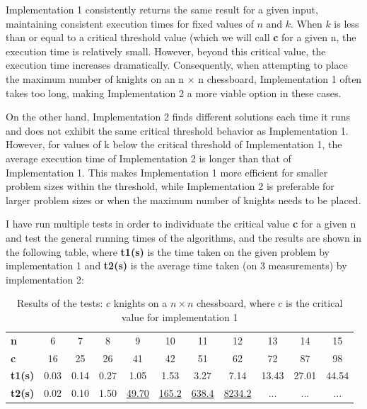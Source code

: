 \documentclass[a4paper,12pt]{article}
\begin{document}
Implementation 1 consistently returns the same result for a given input, maintaining consistent execution times for fixed values of \(n\) and \(k\). When \(k\) is less than or equal to a critical threshold value (which we will call \textbf{c} for a given n, the execution time is relatively small. However, beyond this critical value, the execution time increases dramatically. Consequently, when attempting to place the maximum number of knights on an n × n chessboard, Implementation 1 often takes too long, making Implementation 2 a more viable option in these cases.

On the other hand, Implementation 2 finds different solutions each time it runs and does not exhibit the same critical threshold behavior as Implementation 1. However, for values of k below the critical threshold of Implementation 1, the average execution time of Implementation 2 is longer than that of Implementation 1. This makes Implementation 1 more efficient for smaller problem sizes within the threshold, while Implementation 2 is preferable for larger problem sizes or when the maximum number of knights needs to be placed.

I have run multiple tests in order to individuate the critical value \textbf{c} for a given n and test the general running times of the algorithms, and the results are shown in the following table, where \textbf{t1(s)} is the time taken on the given problem by implementation 1 and \textbf{t2(s)} is the average time taken (on 3 measurements) by implementation 2: 

\begin{table}[H]
    \centering
    \begin{tabular}{l|c|c|c|c|c|c|c|c|c|c|}
        \textbf{n} & 6 & 7 & 8 & 9 & 10 & 11 & 12 & 13 & 14 & 15 \\
        \textbf{c} & 16 & 25 & 26 & 41 & 42 & 51 & 62 & 72 & 87 & 98 \\
        \textbf{t1(s)} & 0.03 & 0.14 & 0.27 & 1.05 & 1.53 & 3.27 & 7.14 & 13.43 & 27.01 & 44.54 \\
        \textbf{t2(s)} & 0.02 & 0.10 & 1.50 & \underline{49.70} & \underline{165.2} & \underline{638.4} & \underline{8234.2} & ... & ... & ... \\
    \end{tabular}
    \caption{Results of the tests: \(c\) knights on a \(n\times n\) chessboard, where \(c\) is the critical value for implementation 1}
    \label{tab:results}
\end{table}
\end{document}
